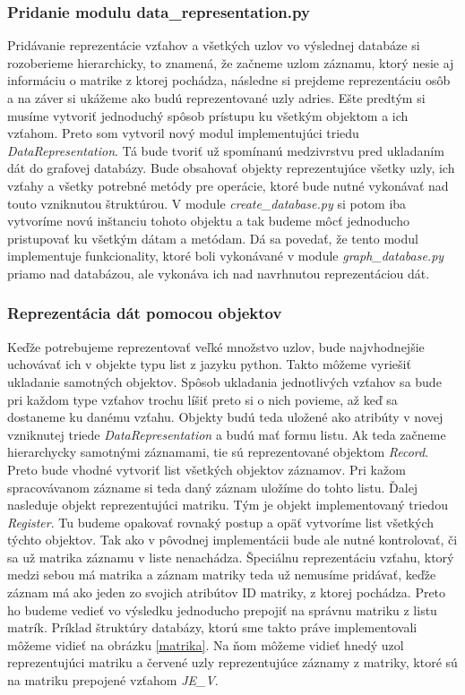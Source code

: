 \subsubsection{Pridanie modulu data\_representation.py}

Pridávanie reprezentácie vzťahov a všetkých uzlov vo výslednej databáze si rozoberieme hierarchicky, to znamená, že začneme uzlom záznamu, ktorý nesie aj informáciu o matrike z ktorej pochádza, následne si prejdeme reprezentáciu osôb a na záver si ukážeme ako budú reprezentované uzly adries. Ešte predtým si musíme vytvoriť jednoduchý spôsob prístupu ku všetkým objektom a ich vzťahom. Preto som vytvoril nový modul implementujúci triedu \textit{DataRepresentation}. Tá bude tvoriť už spomínanú medzivrstvu pred ukladaním dát do grafovej databázy. Bude obsahovať objekty reprezentujúce všetky uzly, ich vzťahy a všetky potrebné metódy pre operácie, ktoré bude nutné vykonávať nad touto vzniknutou štruktúrou. V module \textit{create\_database.py} si potom iba vytvoríme novú inštanciu tohoto objektu a tak budeme môcť jednoducho pristupovať ku všetkým dátam a metódam. Dá sa povedať, že tento modul implementuje funkcionality, ktoré boli vykonávané v module \textit{graph\_database.py} priamo nad databázou, ale vykonáva ich nad navrhnutou reprezentáciou dát.

\subsubsection{Reprezentácia dát pomocou objektov}

Keďže potrebujeme reprezentovať veľké množstvo uzlov, bude najvhodnejšie uchovávať ich v objekte typu list z jazyku python. Takto môžeme vyriešiť ukladanie samotných objektov. Spôsob ukladania jednotlivých vzťahov sa bude pri každom type vzťahov trochu líšiť preto si o nich povieme, až keď sa dostaneme ku danému vzťahu. Objekty budú teda uložené ako atribúty v novej vzniknutej triede \textit{DataRepresentation} a budú mať formu listu. Ak teda začneme hierarchycky samotnými záznamami, tie sú reprezentované objektom \textit{Record}. Preto bude vhodné vytvoriť list všetkých objektov záznamov. Pri kažom spracovávanom zázname si teda daný záznam uložíme do tohto listu. Ďalej nasleduje objekt reprezentujúci matriku. Tým je objekt implementovaný triedou \textit{Register}. Tu budeme opakovať rovnaký postup a opäť vytvoríme list všetkých týchto objektov. Tak ako v pôvodnej implementácii bude ale nutné kontrolovať, či sa už matrika záznamu v liste nenachádza. Špeciálnu reprezentáciu vzťahu, ktorý medzi sebou má matrika a záznam matriky teda už nemusíme pridávať, keďže záznam má ako jeden zo svojich atribútov ID matriky, z ktorej pochádza. Preto ho budeme vedieť vo výsledku jednoducho prepojiť na správnu matriku z listu matrík. Príklad štruktúry databázy, ktorú sme takto práve implementovali môžeme vidieť na obrázku \ref{matrika}. Na ňom môžeme vidieť hnedý uzol reprezentujúci matriku a červené uzly reprezentujúce záznamy z matriky, ktoré sú na matriku prepojené vzťahom \textit{JE\_V}.

